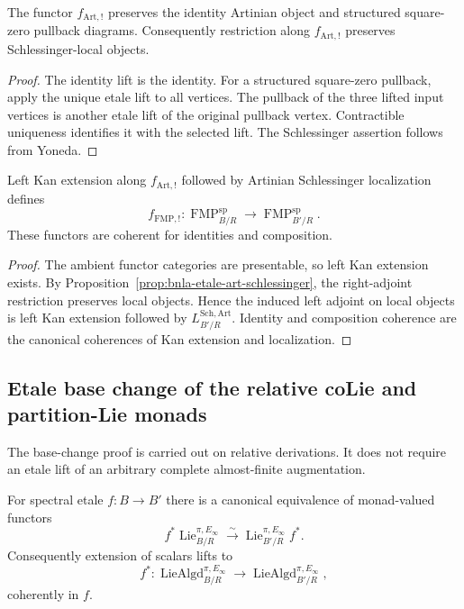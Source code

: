\begin{proposition}
\label{prop:bnla-etale-art-schlessinger}
The functor $f_{\mathrm{Art},!}$ preserves the identity Artinian object and
structured square-zero pullback diagrams.  Consequently restriction along
$f_{\mathrm{Art},!}$ preserves Schlessinger-local objects.
\end{proposition}

\begin{proof}
The identity lift is the identity.  For a structured square-zero pullback,
apply the unique etale lift to all vertices.  The pullback of the three lifted
input vertices is another etale lift of the original pullback vertex.
Contractible uniqueness identifies it with the selected lift.  The
Schlessinger assertion follows from Yoneda.
\end{proof}

\begin{proposition}
\label{prop:bnla-spectral-fmp-center-change}
Left Kan extension along $f_{\mathrm{Art},!}$ followed by Artinian
Schlessinger localization defines
\[
    f_{\mathrm{FMP},!}:
    \operatorname{FMP}^{\mathrm{sp}}_{B/R}
    \longrightarrow
    \operatorname{FMP}^{\mathrm{sp}}_{B'/R}.
\]
These functors are coherent for identities and composition.
\end{proposition}

\begin{proof}
The ambient functor categories are presentable, so left Kan extension exists.
By Proposition~\ref{prop:bnla-etale-art-schlessinger}, the right-adjoint
restriction preserves local objects.  Hence the induced left adjoint on local
objects is left Kan extension followed by
$L^{\mathrm{Sch,Art}}_{B'/R}$.  Identity and composition coherence are the
canonical coherences of Kan extension and localization.
\end{proof}

\subsection{Etale base change of the relative coLie and partition-Lie monads}

The base-change proof is carried out on relative derivations.  It does not
require an etale lift of an arbitrary complete almost-finite augmentation.

\begin{theorem}
\label{thm:bnla-spectral-algebroid-etale-base-change}
For spectral etale $f:B\to B'$ there is a canonical equivalence of monad-valued
functors
\[
\boxed{
    f^*\operatorname{Lie}^{\pi,E_\infty}_{B/R}
    \xrightarrow{\sim}
    \operatorname{Lie}^{\pi,E_\infty}_{B'/R}f^*.}
\]
Consequently extension of scalars lifts to
\[
    f^*:
    \operatorname{LieAlgd}^{\pi,E_\infty}_{B/R}
    \longrightarrow
    \operatorname{LieAlgd}^{\pi,E_\infty}_{B'/R},
\]
coherently in $f$.
\end{theorem}

